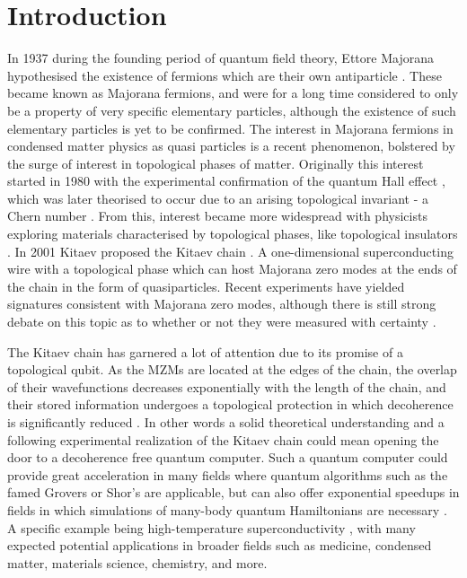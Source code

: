 \chapter{Introduction}
In 1937 during the founding period of quantum field theory, Ettore Majorana hypothesised the existence of fermions which are their own antiparticle \cite{majoranaTeoriaSimmetricaDellelettrone1937}. These became known as Majorana fermions, and were for a long time considered to only be a property of very specific elementary particles, although the existence of such elementary particles is yet to be confirmed. The interest in Majorana fermions in condensed matter physics as quasi particles is a recent phenomenon, bolstered by the surge of interest in topological phases of matter. Originally this interest started in 1980 with the experimental confirmation of the quantum Hall effect \cite{klitzingNewMethodHighAccuracy1980}, which was later theorised to occur due to an arising topological invariant - a Chern number \cite{thoulessQuantizedHallConductance1982}. From this, interest became more widespread with physicists exploring materials characterised by topological phases, like topological insulators \cite{hasanColloquiumTopologicalInsulators2010}. In 2001 Kitaev proposed the Kitaev chain \cite{kitaevUnpairedMajoranaFermions2001a}. A one-dimensional superconducting wire with a topological phase which can host Majorana zero modes at the ends of the chain in the form of quasiparticles. Recent experiments have yielded signatures consistent with Majorana zero modes, although there is still strong debate on this topic as to whether or not they were measured with certainty \cite{frolovDataSharingHelps2026}. 

The Kitaev chain has garnered a lot of attention due to its promise of a topological qubit. As the MZMs are located at the edges of the chain, the overlap of their wavefunctions decreases exponentially with the length of the chain, and their stored information undergoes a topological protection in which decoherence is significantly reduced \cite{nayakNonAbelianAnyonsTopological2008}. In other words a solid theoretical understanding and a following experimental realization of the Kitaev chain could mean opening the door to a decoherence free quantum computer. Such a quantum computer could provide great acceleration in many fields where quantum algorithms such as the famed Grovers\cite{groverFastQuantumMechanical1996} or Shor's\cite{shorPolynomialTimeAlgorithmsPrime} are applicable, but can also offer exponential speedups in fields in which simulations of many-body quantum Hamiltonians are necessary \cite{feynmanSimulatingPhysicsComputers1982}. A specific example being high-temperature superconductivity \cite{nayakNonAbelianAnyonsTopological2008}, with many expected potential applications in broader fields such as medicine, condensed matter, materials science, chemistry, and more. 

